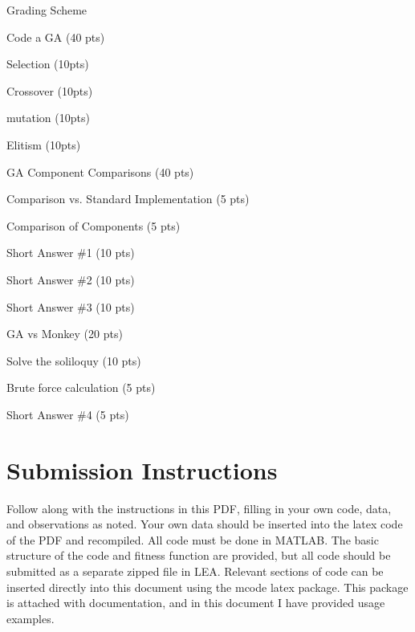\documentclass{article}
\begin{document}
	\begin{itemize}
  	\item Grading Scheme
  		\item GA Component Comparisons (40 pts)
  		\item GA vs Monkey (20 pts)
  		\end{todolist}
	\end{itemize}
\newpage


\section{Submission Instructions}
Follow along with the instructions in this PDF, filling in your own code, data, and observations as noted. Your own data should be inserted into the latex code of the PDF and recompiled. All code must be done in MATLAB. The basic structure of the code and fitness function are provided, but all code should be submitted as a separate zipped file in LEA. Relevant sections of code can be inserted directly into this document using the mcode latex package. This package is attached with documentation, and in this document I have provided usage examples.
\end{document}
